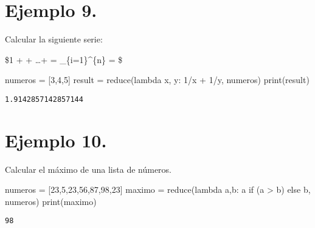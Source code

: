 \documentclass[
  letterpaper,
  DIV=11,
  numbers=noendperiod]{scrreprt}
\newenvironment{Shaded}{\begin{snugshade}}{\end{snugshade}}
\newcommand{\BuiltInTok}[1]{\textcolor[rgb]{0.00,0.23,0.31}{#1}}
\newcommand{\ControlFlowTok}[1]{\textcolor[rgb]{0.00,0.23,0.31}{#1}}
\newcommand{\DecValTok}[1]{\textcolor[rgb]{0.68,0.00,0.00}{#1}}
\newcommand{\KeywordTok}[1]{\textcolor[rgb]{0.00,0.23,0.31}{#1}}
\newcommand{\NormalTok}[1]{\textcolor[rgb]{0.00,0.23,0.31}{#1}}
\newcommand{\OperatorTok}[1]{\textcolor[rgb]{0.37,0.37,0.37}{#1}}
\begin{document}
\section{\texorpdfstring{\textbf{Ejemplo
9.}}{Ejemplo 9.}}\label{ejemplo-9.}

Calcular la siguiente serie:

\$1 +  + \dots +  =
\sum\limits\_\{i=1\}\^{}\{n\}  = \$

\begin{Shaded}
\begin{Highlighting}[]
\NormalTok{numeros }\OperatorTok{=}\NormalTok{ [}\DecValTok{3}\NormalTok{,}\DecValTok{4}\NormalTok{,}\DecValTok{5}\NormalTok{]}
\NormalTok{result }\OperatorTok{=} \BuiltInTok{reduce}\NormalTok{(}\KeywordTok{lambda}\NormalTok{ x, y: }\DecValTok{1}\OperatorTok{/}\NormalTok{x }\OperatorTok{+} \DecValTok{1}\OperatorTok{/}\NormalTok{y, numeros)}
\BuiltInTok{print}\NormalTok{(result)}
\end{Highlighting}
\end{Shaded}

\begin{verbatim}
1.9142857142857144
\end{verbatim}

\section{\texorpdfstring{\textbf{Ejemplo
10.}}{Ejemplo 10.}}\label{ejemplo-10.}

Calcular el máximo de una lista de números.

\begin{Shaded}
\begin{Highlighting}[]
\NormalTok{numeros }\OperatorTok{=}\NormalTok{ [}\DecValTok{23}\NormalTok{,}\DecValTok{5}\NormalTok{,}\DecValTok{23}\NormalTok{,}\DecValTok{56}\NormalTok{,}\DecValTok{87}\NormalTok{,}\DecValTok{98}\NormalTok{,}\DecValTok{23}\NormalTok{]}
\NormalTok{maximo }\OperatorTok{=} \BuiltInTok{reduce}\NormalTok{(}\KeywordTok{lambda}\NormalTok{ a,b: a }\ControlFlowTok{if}\NormalTok{ (a }\OperatorTok{\textgreater{}}\NormalTok{ b) }\ControlFlowTok{else}\NormalTok{ b, numeros)}
\BuiltInTok{print}\NormalTok{(maximo)}
\end{Highlighting}
\end{Shaded}

\begin{verbatim}
98
\end{verbatim}
\end{document}
